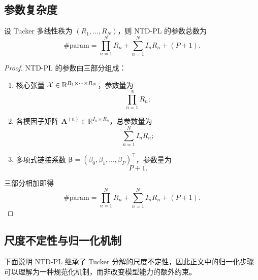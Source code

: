 \subsection{参数复杂度}

\begin{proposition}[参数复杂度]
\label{prop:param_complexity_app}
设 Tucker 多线性秩为 $(R_1,\dots,R_N)$，则 NTD-PL 的参数总数为
\begin{equation}
\#\mathrm{param}
=
\prod_{n=1}^{N}R_n
+
\sum_{n=1}^{N}I_nR_n
+
(P+1).
\end{equation}
\end{proposition}

\begin{proof}
NTD-PL 的参数由三部分组成：

\begin{enumerate}
    \item 核心张量 $\mathcal{X}\in\mathbb{R}^{R_1\times\cdots\times R_N}$，参数量为
    \begin{equation}
    \prod_{n=1}^{N}R_n;
    \end{equation}

    \item 各模因子矩阵 $\mathbf A^{(n)}\in\mathbb{R}^{I_n\times R_n}$，总参数量为
    \begin{equation}
    \sum_{n=1}^{N}I_nR_n;
    \end{equation}

    \item 多项式链接系数 $\boldsymbol\beta=(\beta_0,\beta_1,\dots,\beta_P)^\top$，参数量为
    \begin{equation}
    P+1.
    \end{equation}
\end{enumerate}

三部分相加即得
\begin{equation}
\#\mathrm{param}
=
\prod_{n=1}^{N}R_n
+
\sum_{n=1}^{N}I_nR_n
+
(P+1).
\end{equation}
\end{proof}

\subsection{尺度不定性与归一化机制}

下面说明 NTD-PL 继承了 Tucker 分解的尺度不定性，因此正文中的归一化步骤可以理解为一种规范化机制，而非改变模型能力的额外约束。

